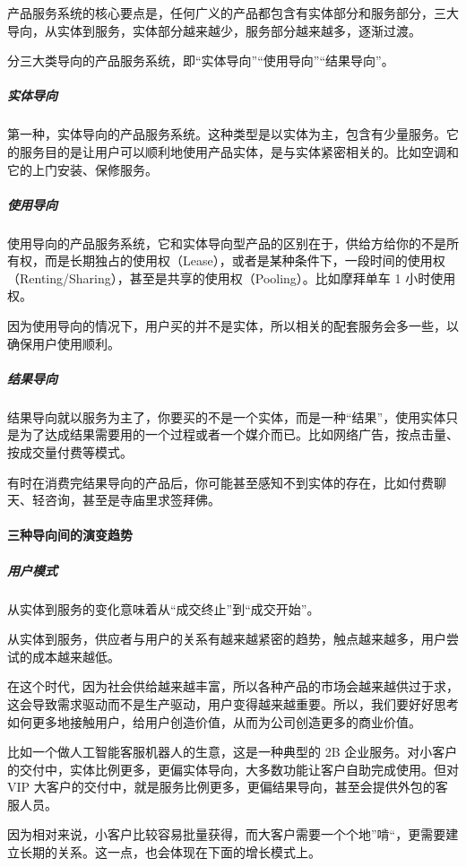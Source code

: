 \documentclass[letterpaper,11pt,english]{sphinxmanual}
\begin{document}
产品服务系统的核心要点是，任何广义的产品都包含有实体部分和服务部分，三大导向，从实体到服务，实体部分越来越少，服务部分越来越多，逐渐过渡。

分三大类导向的产品服务系统，即“实体导向”“使用导向”“结果导向”。


\subparagraph{实体导向}
\label{\detokenize{chapter_introduction/Product:id31}}
第一种，实体导向的产品服务系统。这种类型是以实体为主，包含有少量服务。它的服务目的是让用户可以顺利地使用产品实体，是与实体紧密相关的。比如空调和它的上门安装、保修服务。


\subparagraph{使用导向}
\label{\detokenize{chapter_introduction/Product:id32}}
使用导向的产品服务系统，它和实体导向型产品的区别在于，供给方给你的不是所有权，而是长期独占的使用权（Lease），或者是某种条件下，一段时间的使用权（Renting/Sharing），甚至是共享的使用权（Pooling）。比如摩拜单车
1 小时使用权。

因为使用导向的情况下，用户买的并不是实体，所以相关的配套服务会多一些，以确保用户使用顺利。


\subparagraph{结果导向}
\label{\detokenize{chapter_introduction/Product:id33}}
结果导向就以服务为主了，你要买的不是一个实体，而是一种“结果”，使用实体只是为了达成结果需要用的一个过程或者一个媒介而已。比如网络广告，按点击量、按成交量付费等模式。

有时在消费完结果导向的产品后，你可能甚至感知不到实体的存在，比如付费聊天、轻咨询，甚至是寺庙里求签拜佛。


\paragraph{三种导向间的演变趋势}
\label{\detokenize{chapter_introduction/Product:id34}}

\subparagraph{用户模式}
\label{\detokenize{chapter_introduction/Product:id35}}
从实体到服务的变化意味着从“成交终止”到“成交开始”。

从实体到服务，供应者与用户的关系有越来越紧密的趋势，触点越来越多，用户尝试的成本越来越低。

在这个时代，因为社会供给越来越丰富，所以各种产品的市场会越来越供过于求，这会导致需求驱动而不是生产驱动，用户变得越来越重要。所以，我们要好好思考如何更多地接触用户，给用户创造价值，从而为公司创造更多的商业价值。

比如一个做人工智能客服机器人的生意，这是一种典型的 2B
企业服务。对小客户的交付中，实体比例更多，更偏实体导向，大多数功能让客户自助完成使用。但对
VIP
大客户的交付中，就是服务比例更多，更偏结果导向，甚至会提供外包的客服人员。

因为相对来说，小客户比较容易批量获得，而大客户需要一个个地”啃“，更需要建立长期的关系。这一点，也会体现在下面的增长模式上。
\end{document}
